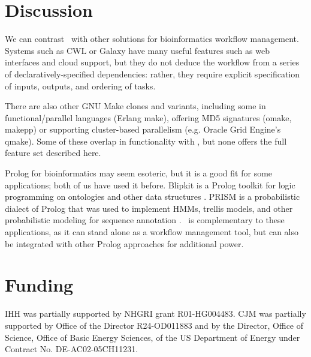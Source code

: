\section*{Discussion}

We can contrast \biomake\ with other solutions for bioinformatics workflow management.
Systems such as CWL or Galaxy have many useful features such as web interfaces and cloud support,
but they do not deduce the workflow from a series of declaratively-specified dependencies: rather, they require explicit specification of inputs, outputs, and ordering of tasks.

There are also other GNU Make clones and variants, including some in functional/parallel languages (Erlang make),
offering MD5 signatures (omake, makepp)
or supporting cluster-based parallelism (e.g. Oracle Grid Engine's qmake).
Some of these overlap in functionality with \biomake, but none offers the full feature set described here.

Prolog for bioinformatics may seem esoteric, but it is a good fit for some applications; both of us have used it before.
Blipkit is a Prolog toolkit for logic programming on ontologies and other data structures \citep{Blipkit2009}.
PRISM is a probabilistic dialect of Prolog that was used to implement HMMs, trellis models, and other probabilistic modeling for sequence annotation \citep{MorkHolmes2012,HaveMork2014}.
\biomake\ is complementary to these applications, as it can stand alone as a workflow management tool, but can also be integrated with other Prolog approaches for additional power.

%

\section*{Funding}

IHH was partially supported by NHGRI grant R01-HG004483. CJM was partially supported by Office of the Director R24-OD011883 and by the Director, Office of Science, Office of Basic Energy Sciences, of the US Department of Energy under Contract No. DE-AC02-05CH11231.


%
%
%
%
%
%
%
%




